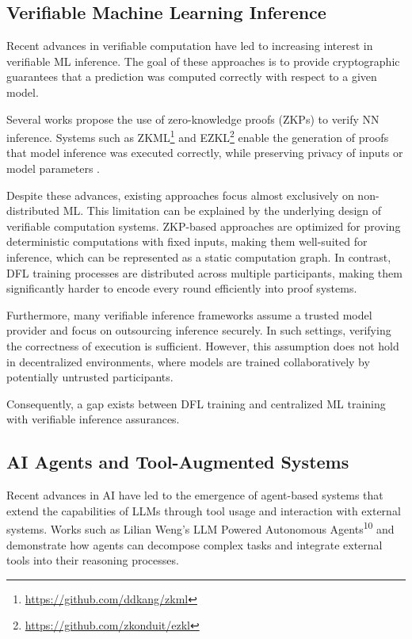 \subsection{Verifiable Machine Learning Inference}

Recent advances in verifiable computation have led to increasing interest in verifiable \ac{ML} inference. The goal of these approaches is to provide cryptographic guarantees that a prediction was computed correctly with respect to a given model.

Several works propose the use of zero-knowledge proofs (ZKPs) to verify \ac{NN} inference. Systems such as ZKML\footnote{\url{https://github.com/ddkang/zkml}} and EZKL\footnote{\url{https://github.com/zkonduit/ezkl}} enable the generation of proofs that model inference was executed correctly, while preserving privacy of inputs or model parameters \cite{10.1145/3627703.3650088}.

Despite these advances, existing approaches focus almost exclusively on non-distributed \ac{ML}. This limitation can be explained by the underlying design of verifiable computation systems. \ac{ZKP}-based approaches are optimized for proving deterministic computations with fixed inputs, making them well-suited for inference, which can be represented as a static computation graph. In contrast, \ac{DFL} training processes are distributed across multiple participants, making them significantly harder to encode every round efficiently into proof systems.

Furthermore, many verifiable inference frameworks assume a trusted model provider and focus on outsourcing inference securely. In such settings, verifying the correctness of execution is sufficient. However, this assumption does not hold in decentralized environments, where models are trained collaboratively by potentially untrusted participants.

Consequently, a gap exists between \ac{DFL} training and centralized \ac{ML} training with verifiable inference assurances.

\subsection{AI Agents and Tool-Augmented Systems}

Recent advances in \ac{AI} have led to the emergence of agent-based systems that extend the capabilities of \acp{LLM} through tool usage and interaction with external systems. Works such as Lilian Weng's \ac{LLM} Powered Autonomous Agents\textsuperscript{10} and \cite{yao2023react} demonstrate how agents can decompose complex tasks and integrate external tools into their reasoning processes.

